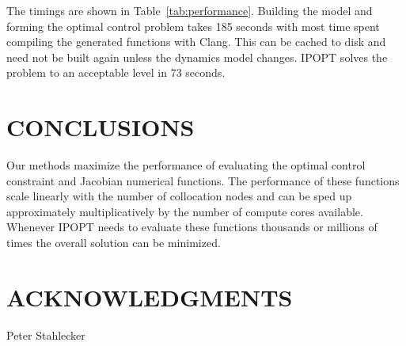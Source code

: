 \documentclass[11pt,twocolumn]{article}
\begin{document}
The timings are shown in Table~\ref{tab:performance}. Building the model and
forming the optimal control problem takes 185 seconds with most time spent
compiling the generated functions with Clang. This can be cached to disk and
need not be built again unless the dynamics model changes. IPOPT solves the
problem to an acceptable level in 73 seconds.

\section*{CONCLUSIONS}
%
Our methods maximize the performance of evaluating the optimal control
constraint and Jacobian numerical functions. The performance of these functions
scale linearly with the number of collocation nodes and can be sped up
approximately multiplicatively by the number of compute cores available.
Whenever IPOPT needs to evaluate these functions thousands or millions of times
the overall solution can be minimized.




\section*{ACKNOWLEDGMENTS}
Peter Stahlecker
\end{document}
